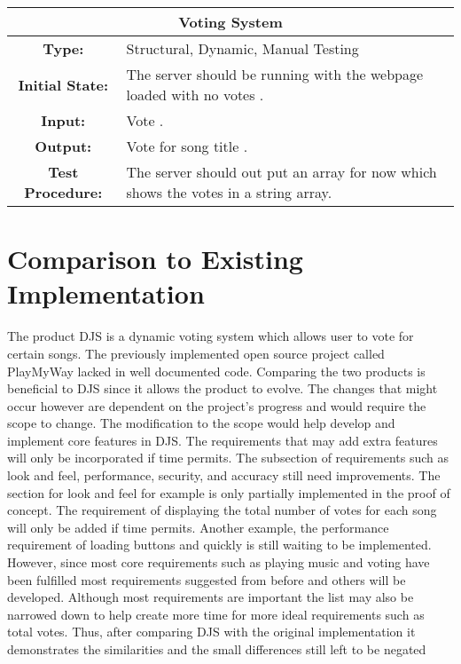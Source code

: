 \documentclass[12pt, titlepage]{article}
\begin{document}
\begin{center}
\begin{table}[H]
\begin{tabularx}{\textwidth}{| c X |}
\hline
\multicolumn{2}{|c|}{\textbf{Voting System}}\\
\hline
\textbf{Type: } & Structural, Dynamic, Manual Testing\\

\textbf{Initial State: } & The server should be running with the webpage loaded with no votes .\\

\textbf{Input: } & Vote .\\

\textbf{Output: } & Vote for song title .\\

\textbf{Test Procedure: } & The server should out put an array for now which shows the votes in a string array. \\
\hline
\end{tabularx}
\end{table}
\end{center}



	
\section{Comparison to Existing Implementation}	
The product DJS is a dynamic voting system which allows user to vote for certain songs. The previously implemented open source project called PlayMyWay lacked in well documented code. Comparing the two products is beneficial to DJS since it allows the product to evolve. The changes that might occur however are dependent on the project's progress and would require the scope to change. The modification to the scope would help develop and implement core features in DJS. The requirements that may add extra features will only be incorporated if time permits. The subsection of requirements such as look and feel, performance, security, and accuracy still need improvements. The section for look and feel for example is only partially implemented in the proof of concept. The requirement of displaying the total number of votes for each song will only be added if time permits. Another example, the performance requirement of loading buttons and quickly is still waiting to be implemented.  However, since most core requirements such as playing music and voting have been fulfilled most requirements suggested from before and others will be developed. Although most requirements are important  the list may also be narrowed down to help create more time for more ideal requirements such as total votes. Thus, after comparing DJS with the original implementation it demonstrates the similarities and the small differences still left to be negated  
				
\end{document}
